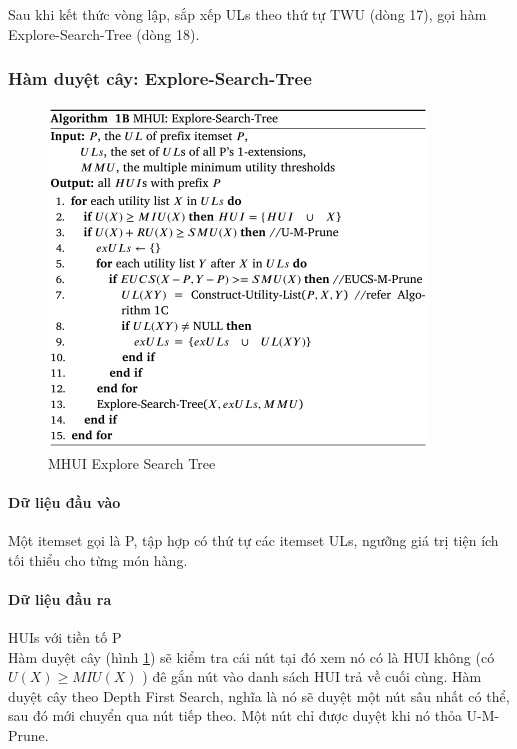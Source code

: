 Sau khi kết thức vòng lập, sắp xếp ULs theo thứ tự TWU (dòng 17), gọi hàm Explore-Search-Tree (dòng 18). 

\subsubsection{Hàm duyệt cây: Explore-Search-Tree }

\begin{figure}[ht]
\centering
\includegraphics[width=0.9\textwidth]{image/algo/algo2.PNG}
\caption{\label{fig:algo2} MHUI Explore Search Tree}
\end{figure}

\paragraph{Dữ liệu đầu vào} Một itemset gọi là P, tập hợp có thứ tự các itemset ULs, ngưỡng giá trị tiện ích tối thiểu cho từng món hàng.

\paragraph{Dữ liệu đầu ra} HUIs với tiền tố P \\

Hàm duyệt cây (hình \ref{fig:algo2}) sẽ kiểm tra cái nút tại đó xem nó có là HUI không (có $U(X) \geq MIU(X)$ ) đê gắn nút vào danh sách HUI trả về cuối cùng. Hàm duyệt cây theo Depth First Search, nghĩa là nó sẽ duyệt một nút sâu nhất có thể, sau đó mới chuyển qua nút tiếp theo. Một nút chỉ được duyệt khi nó thỏa U-M-Prune. 

